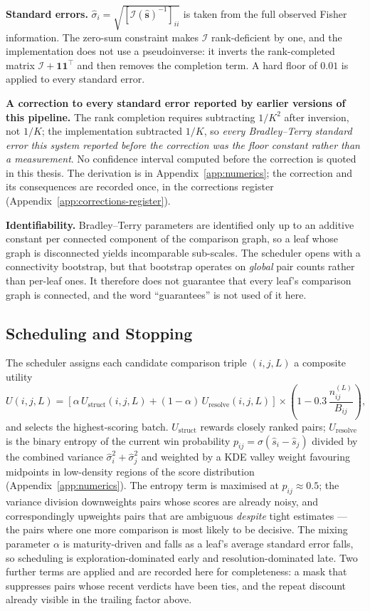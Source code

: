 \textbf{Standard errors.}
$\hat{\sigma}_i = \sqrt{[\mathcal{I}(\hat{\mathbf{s}})^{-1}]_{ii}}$ is
taken from the full observed Fisher information. The zero-sum
constraint makes $\mathcal{I}$ rank-deficient by one, and the
implementation does not use a pseudoinverse: it inverts the
rank-completed matrix $\mathcal{I} + \mathbf{1}\mathbf{1}^{\!\top}$ and
then removes the completion term. A hard floor of $0.01$ is applied to
every standard error.

\textbf{A correction to every standard error reported by earlier
versions of this pipeline.}
The rank completion requires subtracting $1/K^{2}$ after inversion,
not $1/K$; the implementation subtracted $1/K$, so \emph{every
Bradley--Terry standard error this system reported before the
correction was the floor constant rather than a measurement}. No
confidence interval computed before the correction is quoted in this
thesis. The derivation is in Appendix~\ref{app:numerics}; the
correction and its consequences are recorded once, in the corrections
register (Appendix~\ref{app:corrections-register}).

\textbf{Identifiability.}
Bradley--Terry parameters are identified only up to an additive
constant per connected component of the comparison graph, so a leaf
whose graph is disconnected yields incomparable sub-scales. The
scheduler opens with a connectivity bootstrap, but that bootstrap
operates on \emph{global} pair counts rather than per-leaf ones. It
therefore does not guarantee that every leaf's comparison graph is
connected, and the word ``guarantees'' is not used of it here.

\subsection{Scheduling and Stopping}\label{sec:meth-scheduling}

The scheduler assigns each candidate comparison triple $(i, j, L)$ a
composite utility
\[
U(i,j,L) = \left[\alpha\, U_{\text{struct}}(i,j,L)
+ (1-\alpha)\, U_{\text{resolve}}(i,j,L)\right]
\times \left(1 - 0.3\, \frac{n_{ij}^{(L)}}{B_{ij}}\right),
\]
and selects the highest-scoring batch.
$U_{\text{struct}}$ rewards closely ranked pairs; $U_{\text{resolve}}$
is the binary entropy of the current win probability
$p_{ij} = \sigma(\hat{s}_i - \hat{s}_j)$ divided by the combined
variance $\hat{\sigma}_i^2 + \hat{\sigma}_j^2$ and weighted by a KDE
valley weight favouring midpoints in low-density regions of the score
distribution (Appendix~\ref{app:numerics}).
The entropy term is maximised at $p_{ij} \approx 0.5$; the variance
division downweights pairs whose scores are already noisy, and
correspondingly upweights pairs that are ambiguous \emph{despite}
tight estimates --- the pairs where one more comparison is most likely
to be decisive.
The mixing parameter $\alpha$ is maturity-driven and falls as a leaf's
average standard error falls, so scheduling is exploration-dominated
early and resolution-dominated late. Two further terms are applied and
are recorded here for completeness: a mask that suppresses pairs whose
recent verdicts have been ties, and the repeat discount already visible
in the trailing factor above.

